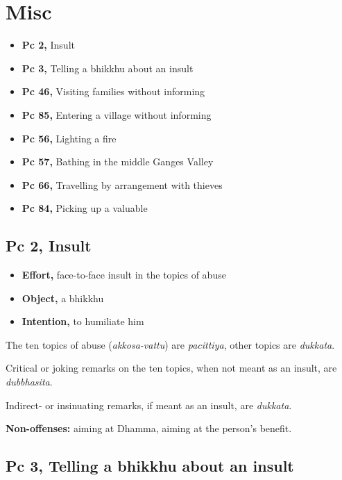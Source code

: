\chapter{Misc}

\begin{itemize}
\tightlist
\item
  \textbf{Pc 2,} Insult
\item
  \textbf{Pc 3,} Telling a bhikkhu about an insult
\item
  \textbf{Pc 46,} Visiting families without informing
\item
  \textbf{Pc 85,} Entering a village without informing
\item
  \textbf{Pc 56,} Lighting a fire
\item
  \textbf{Pc 57,} Bathing in the middle Ganges Valley
\item
  \textbf{Pc 66,} Travelling by arrangement with thieves
\item
  \textbf{Pc 84,} Picking up a valuable
\end{itemize}

\section{Pc 2, Insult}

\begin{multicols}{2}

\begin{itemize}
\tightlist
\item
  \textbf{Effort,} face-to-face insult in the topics of abuse
\item
  \textbf{Object,} a bhikkhu
\item
  \textbf{Intention,} to humiliate him
\end{itemize}

The ten topics of abuse (\emph{akkosa-vattu}) are \emph{pacittiya},
other topics are \emph{dukkata}.

Critical or joking remarks on the ten topics, when not meant as an
insult, are \emph{dubbhasita}.

Indirect- or insinuating remarks, if meant as an insult, are
\emph{dukkata}.

\textbf{Non-offenses:} aiming at Dhamma, aiming at the person's benefit.

\end{multicols}

\section{Pc 3, Telling a bhikkhu about an insult}

